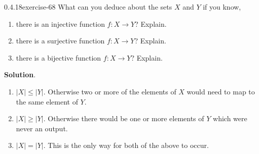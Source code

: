 \documentclass[twoside,11pt,]{book}
\numberwithin{equation}{chapter}
\begin{document}
\begin{divisionsolution}{0.4.18}{}{exercise-68}%
\hypertarget{p-1108}{}%
What can you deduce about the sets \(X\) and \(Y\) if you know,\leavevmode%
\begin{enumerate}[label=(\alph*)]
\item\hypertarget{li-891}{}\hypertarget{p-1109}{}%
there is an injective function \(f:X \to Y\)? Explain.%
\item\hypertarget{li-892}{}\hypertarget{p-1110}{}%
there is a surjective function \(f:X \to Y\)? Explain.%
\item\hypertarget{li-893}{}\hypertarget{p-1111}{}%
there is a bijective function \(f:X \to Y\)? Explain.%
\end{enumerate}
%
\par\smallskip%
\noindent\textbf{Solution}.\quad%
\hypertarget{p-1112}{}%
\leavevmode%
\begin{enumerate}[label=(\alph*)]
\item\hypertarget{li-894}{}\hypertarget{p-1113}{}%
\(|X| \le |Y|\). Otherwise two or more of the elements of \(X\) would need to map to the same element of \(Y\).%
\item\hypertarget{li-895}{}\hypertarget{p-1114}{}%
\(|X| \ge |Y|\). Otherwise there would be one or more elements of \(Y\) which were never an output.%
\item\hypertarget{li-896}{}\hypertarget{p-1115}{}%
\(|X| = |Y|\). This is the only way for both of the above to occur.%
\end{enumerate}
%
\end{divisionsolution}%
\end{document}
